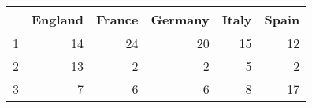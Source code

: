 \begin{table}[ht]
\centering
\begin{tabular}{rrrrrr}
  \hline
 & England & France & Germany & Italy & Spain \\ 
  \hline
1 &  14 &  24 &  20 &  15 &  12 \\ 
  2 &  13 &   2 &   2 &   5 &   2 \\ 
  3 &   7 &   6 &   6 &   8 &  17 \\ 
   \hline
\end{tabular}
\end{table}

